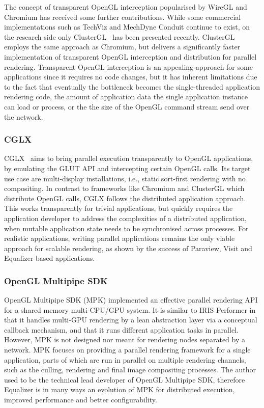 The concept of transparent OpenGL interception popularised by WireGL and
Chromium has received some further contributions. While some commercial
implementations such as {TechViz} and {MechDyne Conduit} continue to exist, on
the research side only {ClusterGL}~\cite{NHM:11} has been presented recently.
{ClusterGL} employs the same approach as {Chromium}, but delivers a
significantly faster implementation of transparent OpenGL interception and
distribution for parallel rendering. Transparent OpenGL interception is an
appealing approach for some applications since it requires no code changes, but
it has inherent limitations due to the fact that eventually the bottleneck
becomes the single-threaded application rendering code, the amount of
application data the single application instance can load or process, or the the
size of the OpenGL command stream send over the network.

\subsubsection{CGLX}

{CGLX}~\cite{DK:11} aims to bring parallel execution transparently to OpenGL
applications, by emulating the GLUT API and intercepting certain OpenGL calls.
Its target use case are multi-display installations, i.e., static sort-first
rendering with no compositing. In contrast to frameworks like {Chromium} and
{ClusterGL} which distribute OpenGL calls, {CGLX} follows the distributed
application approach. This works transparently for trivial applications, but
quickly requires the application developer to address the complexities of a
distributed application, when mutable application state needs to be
synchronised across processes. For realistic applications, writing parallel
applications remains the only viable approach for scalable rendering, as shown
by the success of {Paraview}, {Visit} and {Equalizer}-based applications.

\subsubsection{OpenGL Multipipe SDK}

OpenGL Multipipe SDK (MPK) \cite{BRE:05} implemented an effective parallel
rendering API for a shared memory multi-CPU/GPU system. It is similar to IRIS
Performer \cite{RH:94} in that it handles multi-GPU rendering by a lean
abstraction layer via a conceptual callback mechanism, and that it runs
different application tasks in parallel. However, MPK is not designed nor meant
for rendering nodes separated by a network. MPK focuses on providing a parallel
rendering framework for a single application, parts of which are run in
parallel on multiple rendering channels, such as the culling, rendering and
final image compositing processes. The author used to be the technical lead
developer of OpenGL Multipipe SDK, therefore Equalizer is in many ways an
evolution of MPK for distributed execution, improved performance and better
configurability.


